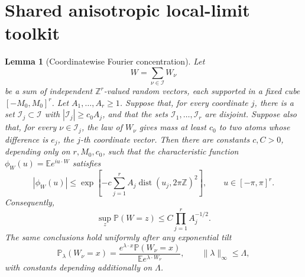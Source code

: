 \documentclass[11pt]{article}
\newtheorem{lemma}[theorem]{Lemma}
\theoremstyle{remark}
\newcommand{\Pp}{\mathbb P}
\newcommand{\Ee}{\mathbb E}
\begin{document}

\section{Shared anisotropic local-limit toolkit}

\begin{lemma}[Coordinatewise Fourier concentration]\label{lem:coord-fourier}
Let
\[
        W=\sum_{\nu\in\mathcal I}W_\nu
\]
be a sum of independent \(\mathbb Z^r\)-valued random vectors, each supported in a fixed cube \([-M_0,M_0]^r\).  Let
\(A_1,\ldots,A_r\ge1\).  Suppose that, for every coordinate \(j\), there is a set
\(\mathcal I_j\subset\mathcal I\) with
\(|\mathcal I_j|\ge c_0A_j\), and that the sets
\(\mathcal I_1,\ldots,\mathcal I_r\) are disjoint.  Suppose also that, for every
\(\nu\in\mathcal I_j\), the law of \(W_\nu\) gives mass at least \(c_0\) to two atoms whose difference is \(e_j\), the \(j\)-th coordinate vector.  Then there are constants
\(c,C>0\), depending only on \(r,M_0,c_0\), such that the characteristic function
\(\phi_W(u)=\Ee e^{iu\cdot W}\) satisfies
\[
        |\phi_W(u)|
        \le \exp\left[-c\sum_{j=1}^r
        A_j\operatorname{dist}(u_j,2\pi\mathbb Z)^2\right],
        \qquad u\in[-\pi,\pi]^r.
\]
Consequently,
\[
        \sup_z\Pp(W=z)\le C\prod_{j=1}^r A_j^{-1/2}.
\]
The same conclusions hold uniformly after any exponential tilt
\[
        \Pp_\lambda(W_\nu=x)
        =\frac{e^{\lambda\cdot x}\Pp(W_\nu=x)}
        {\Ee e^{\lambda\cdot W_\nu}},
        \qquad \|\lambda\|_\infty\le \Lambda,
\]
with constants depending additionally on \(\Lambda\).
\end{lemma}
\end{document}

